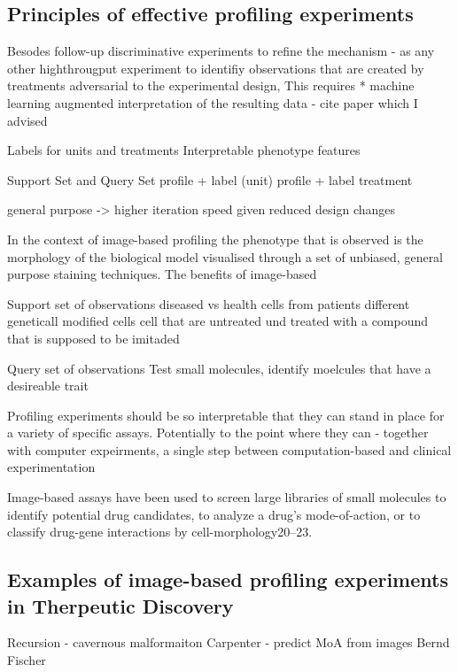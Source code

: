 \begin{flushleft}
\subsection{Principles of effective profiling experiments}

Besodes follow-up discriminative experiments to refine the mechanism - as any other highthrougput experiment to identifiy observations that are created by treatments adversarial to the experimental design, This requires 
* machine learning augmented interpretation of the resulting data - cite paper which I advised


Labels for units and treatments
Interpretable phenotype features

Support Set and Query Set
profile + label (unit)
profile + label treatment




general purpose -> higher iteration speed given reduced design changes





In the context of image-based profiling the phenotype that is observed is the morphology of the biological model visualised through a set of unbiased, general purpose staining techniques. The benefits of image-based 


Support set of observations
diseased vs health cells from patients
different geneticall modified cells 
cell that are untreated und treated with a compound that is supposed to be imitaded 

Query set of observations
Test small molecules, identify moelcules that have a desireable trait

Profiling experiments should be so interpretable that they can stand in place for a variety of specific assays. Potentially to the point where they can - together with computer expeirments, a single step between computation-based and clinical experimentation


Image-based assays have been used to screen large libraries of small molecules to identify potential drug candidates, to analyze a drug’s mode-of-action, or to classify drug-gene interactions by cell-morphology20–23. 

\subsection{Examples of image-based profiling experiments in Therpeutic Discovery}

Recursion - cavernous malformaiton
Carpenter - predict MoA from images
Bernd Fischer




\end{flushleft}
